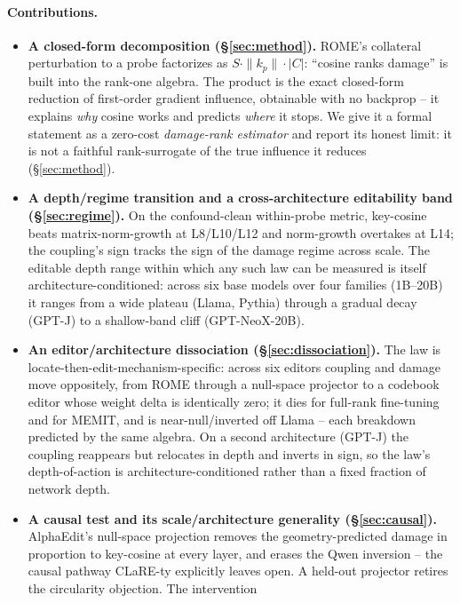 \paragraph{Contributions.}
\begin{itemize}
\item \textbf{A closed-form \SxC{} decomposition (\S\ref{sec:method}).} ROME's
  collateral perturbation to a probe factorizes as
  $S\cdot\|k_p\|\cdot|C|$: ``cosine ranks damage'' is built into the rank-one
  algebra. The product \SxC{} is the exact closed-form reduction of
  first-order gradient influence, obtainable with no backprop -- it explains
  \emph{why} cosine works and predicts \emph{where} it stops. We give it a
  formal statement as a zero-cost \emph{damage-rank estimator} and report its honest
  limit: it is not a faithful rank-surrogate of the true influence it reduces
  (\S\ref{sec:method}).
\item \textbf{A depth/regime transition and a cross-architecture editability
  band (\S\ref{sec:regime}).} On the confound-clean within-probe metric,
  key-cosine beats matrix-norm-growth at L8/L10/L12 and norm-growth overtakes at
  L14; the coupling's sign tracks the sign of the damage regime across scale.
  The editable depth range within which any such law can be measured is itself
  architecture-conditioned: across six base models over four families (1B--20B)
  it ranges from a wide plateau (Llama, Pythia) through a gradual decay (GPT-J)
  to a shallow-band cliff (GPT-NeoX-20B).
\item \textbf{An editor/architecture dissociation (\S\ref{sec:dissociation}).}
  The law is locate-then-edit-mechanism-specific: across six editors coupling
  and damage move oppositely, from ROME through a null-space projector to a
  codebook editor whose weight delta is identically zero; it dies for full-rank
  fine-tuning and for MEMIT, and is near-null/inverted off Llama -- each
  breakdown predicted by the same algebra. On a second architecture (GPT-J) the
  coupling reappears but relocates in depth and inverts in sign, so the law's
  depth-of-action is architecture-conditioned rather than a fixed fraction of
  network depth.
\item \textbf{A causal test and its scale/architecture generality
  (\S\ref{sec:causal}).} AlphaEdit's null-space projection removes the
  geometry-predicted damage in proportion to key-cosine at every layer, and
  erases the Qwen inversion -- the causal pathway CLaRE-ty explicitly leaves open.
  A held-out projector retires the circularity objection. The intervention

\end{itemize}
